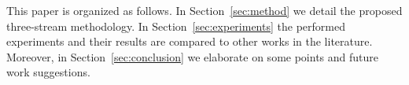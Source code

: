 \documentclass[conference]{IEEEtran}
\begin{document}
This paper is organized as follows. In Section~\ref{sec:method} we detail the proposed three-stream methodology. In Section~\ref{sec:experiments} the performed experiments and their results are compared to other works in the literature. Moreover, in Section~\ref{sec:conclusion} we elaborate on some points and future work suggestions.











\end{document}
